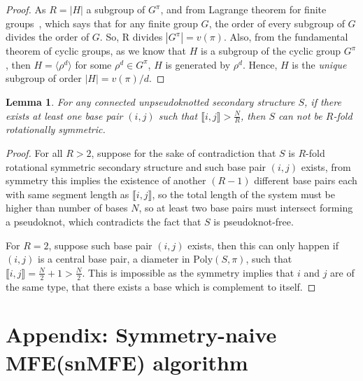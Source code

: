 \documentclass[11pt,letterpaper]{article}  \usepackage[margin=1in]{geometry}
\newtheorem{lemma}[theorem]{Lemma}
\theoremstyle{definition}  \newtheorem{Definition}[theorem]{Definition}
\newcommand{\snMFE}{snMFE\xspace}
\newcommand{\SymnMFE}{Symmetry-naive MFE\xspace}
\newcommand{\PolySpi}{\ensuremath{\mathrm{Poly}(S,\pi)}\xspace}
\begin{document}
\begin{proof}
	As $R = |H|$ a subgroup of $G^\pi$, and from Lagrange theorem for finite groups~\cite{nicholson2012introduction}, which says that for any finite group $G$, the order of every subgroup of $G$ divides the order of $G$. So, R divides $|G^\pi| = v(\pi)$. Also, from the fundamental theorem of cyclic groups, as we know that $H$ is a subgroup of the cyclic group $G^\pi$, then $H = \langle \rho^d \rangle$ for some $\rho^d \in G^\pi$, $H$ is generated by $\rho^d$. Hence, $H$ is the \emph{unique} subgroup of order $|H|= v(\pi)/d$. 
\end{proof}



\begin{lemma} \label{lem:nobase}
	For any connected unpseudoknotted secondary structure $S$, if there exists at least one base pair $(i,j)$ such that $\llbracket i,j \rrbracket > \frac{N}{R}$, then $S$ can not be  $R$-fold rotationally symmetric. 
\end{lemma}
\begin{proof}
	For all $R>2$, suppose for the sake of contradiction that $S$ is $R$-fold rotational symmetric secondary structure and such base pair $(i,j)$ exists, from symmetry this implies the existence of another $(R-1)$ different base pairs each with same segment length as $\llbracket i,j \rrbracket$, so the total length of the system must be higher than number of bases $N$, so at least two base pairs must intersect forming a pseudoknot, which contradicts the fact that $S$ is pseudoknot-free. 
	
	For $R=2$, suppose such base pair $(i,j)$ exists, then this can only happen if $(i,j)$ is a central base pair, a diameter in $\PolySpi$, such that $\llbracket i,j \rrbracket = \frac{N}{2}+1 >  \frac{N}{2}$. This is impossible as the symmetry implies that $i$ and $j$ are of the same type, that there exists a base which is complement to itself.  
\end{proof}



  \newpage
	


\section{Appendix: \SymnMFE  (\snMFE) algorithm}\label{sec:AlgoMFE}
\end{document}
